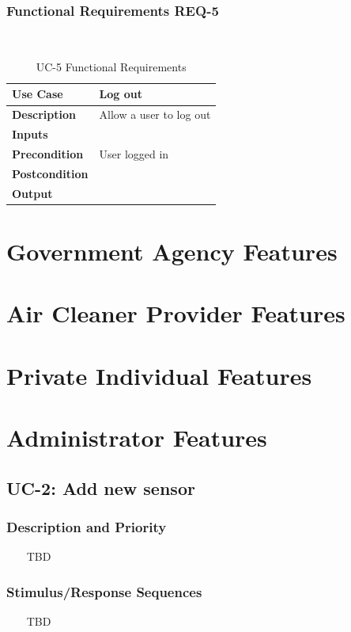 \documentclass{report}
\begin{document}
\subsubsection*{Functional Requirements REQ-5} ~~~
\begin{table}[H]
	\begin{center}
		\begin{tabular}{|m{4cm}|m{10cm}|}
		\hline
		\textbf{Use Case} & Log out \\
		\hline
		\textbf{Description} & Allow a user to log out  \\
		\hline
		\textbf{Inputs} &  \\
		\hline
		\textbf{Precondition} & User logged in  \\
		\hline
		\textbf{Postcondition} &  \\
		\hline
		\textbf{Output} &  \\
		\hline
		\end{tabular}
	\end{center}
	\caption{UC-5 Functional Requirements}
	\label{table:REQ-5}
\end{table}

\section{Government Agency Features}
\section{Air Cleaner Provider Features}
\section{Private Individual Features}
\section{Administrator Features}

\subsection{UC-2: Add new sensor}

\subsubsection*{Description and Priority} ~~~
TBD

\subsubsection*{Stimulus/Response Sequences} ~~~
TBD
\end{document}
